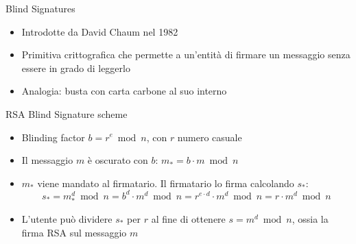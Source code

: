 \documentclass{beamer}
\begin{document}
  
  
  \begin{frame}{Blind Signatures}
      \begin{itemize}
          \item Introdotte da David Chaum nel 1982 \cite{chaum1982blind}
          \item Primitiva crittografica che permette a un'entità di firmare un messaggio senza essere in grado di leggerlo
          \item Analogia: busta con carta carbone al suo interno 
      \end{itemize}
      
      \pause
      \begin{block}{RSA Blind Signature scheme}
        \begin{itemize}
            \item Blinding factor $b=r^{e}\bmod n$, con $r$ numero casuale
            \item Il messaggio $m$ è oscurato con $b$: $m_{*}=b\cdot m\bmod n$
            \item $m_*$ viene mandato al firmatario. Il firmatario lo firma calcolando $s_*$: \[ s_*=m_*^d\bmod n = b^d\cdot m^d\bmod n = r^{e\cdot d}\cdot m^d \bmod n = r\cdot m^d \bmod n \]
            \item L'utente può dividere $s_*$ per $r$ al fine di ottenere $s=m^d\bmod n$, ossia la firma RSA sul messaggio $m$
        \end{itemize}
      \end{block}
  \end{frame}
  
  
  
\end{document}

